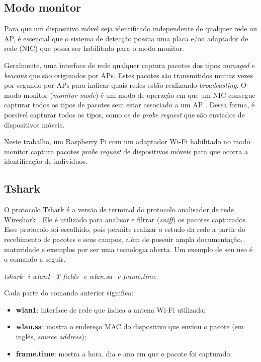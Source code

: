 \subsection{Modo monitor}
\label{modo-monitor}
Para que um dispositivo móvel seja identificado independente de qualquer rede ou AP, é essencial que o sistema de detecção possua uma placa e/ou adaptador de rede (NIC) que possa ser habilitado para o modo monitor.

Geralmente, uma interface de rede qualquer captura pacotes dos tipos \emph{managed} e \emph{beacons} que são originados por APs. Estes pacotes são transmitidos
muitas vezes por segundo por APs para indicar quais redes estão realizando \emph{broadcasting}. O modo monitor (\emph{monitor mode}) é um modo de operação em que um NIC consegue capturar todos os tipos de pacotes sem estar associado a um AP \cite{Acrylic} \cite{Wireshark2017b}. Dessa forma, é possível capturar todos os tipos, como os de \emph{probe request} que são enviados de dispositivos móveis.

Neste trabalho, um Raspberry Pi com um adaptador Wi-Fi habilitado no modo monitor captura pacotes \emph{probe request} de dispositivos móveis
para que ocorra a identificação de indivíduos.

\subsection{Tshark}
O protocolo Tshark é a versão de terminal do protocolo
analisador de rede Wireshark \cite{Wireshark2017} \cite{Wireshark2017a}. Ele é
utilizado para analisar e filtrar (\emph{sniff}) os
pacotes capturados. Esse protocolo foi
escolhido, pois permite realizar o estudo da rede a partir do recebimento de
pacotes e seus campos, além de possuir ampla documentação, maturidade e exemplos
por ser uma tecnologia aberta. Um exemplo de seu uso é o comando a seguir.

\begin{center}
\emph{tshark -i wlan1 -T fields -e wlan.sa -e frame.time}
\end{center}

Cada parte do comando anterior significa:
\begin{itemize}
  \item \textbf{wlan1}: interface de rede que indica a antena Wi-Fi utilizada;
  \item \textbf{wlan.sa}: mostra o endereço MAC do dispositivo que enviou o pacote (em inglês, \emph{source address});
  \item \textbf{frame.time}: mostra a hora, dia e ano em que o pacote foi capturado;
\end{itemize}

